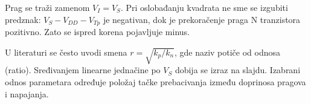 Prag se traži zamenom $V_I=V_S$. Pri oslobađanju kvadrata ne sme se izgubiti predznak: $V_S-V_{DD}-V_{Tp}$ je negativan, dok je prekoračenje praga N tranzistora pozitivno. Zato se ispred korena pojavljuje minus.

U literaturi se često uvodi smena $r=\sqrt{k_p/k_n}$, gde naziv potiče od odnosa (ratio). Sređivanjem linearne jednačine po $V_S$ dobija se izraz na slajdu. Izabrani odnos parametara određuje položaj tačke prebacivanja između doprinosa pragova i napajanja.
